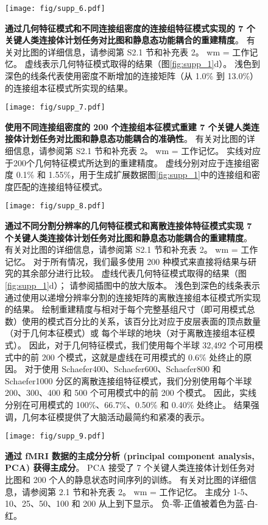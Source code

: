 \documentclass[lang=cn,a4paper,newtx]{elegantpaper}
\begin{document}
\begin{figure}[!htb] 
	\centering
	\texttt{[image: fig/supp\_6.pdf]}
	\caption{
		\textbf{通过几何特征模式和不同连接组密度的连接组特征模式实现的 7 个关键人类连接体计划任务对比图和静息态功能耦合的重建精度}。
		有关对比图的详细信息，请参阅第 S2.1 节和补充表 2。
		wm = 工作记忆。
		虚线表示几何特征模式取得的结果（图\ref{fig:supp_1}d）。
		浅色到深色的线条代表使用密度不断增加的连接矩阵（从 1.0\% 到 13.0\%）的连接组本征模式所实现的结果。
	} \label{fig:supp_6}
\end{figure}


\begin{figure}[!htb] 
	\centering
	\texttt{[image: fig/supp\_7.pdf]}
	\caption{
		\textbf{使用不同连接组密度的 200 个连接组本征模式重建 7 个关键人类连接体计划任务对比图和静息态功能耦合的准确性}。
		有关对比图的详细信息，请参阅第 S2.1 节和补充表 2。
		wm = 工作记忆。
		实线对应于200个几何特征模式所达到的重建精度。
		虚线分别对应于连接组密度 0.1\% 和 1.55\%，用于生成扩展数据图\ref{fig:supp_1}中的连接组和密度匹配的连接组特征模式。
	} \label{fig:supp_7}
\end{figure}


\begin{figure}[!htb] 
	\centering
	\texttt{[image: fig/supp\_8.pdf]}
	\caption{
	\textbf{通过不同分割分辨率的几何特征模式和离散连接体特征模式实现 7 个关键人类连接体计划任务对比图和静息态功能耦合的重建精度}。
	有关对比图的详细信息，请参阅第 S2.1 节和补充表 2。 wm = 工作记忆。
	对于所有情况，我们最多使用 200 种模式来直接将结果与研究的其余部分进行比较。
	虚线代表几何特征模式取得的结果（图\ref{fig:supp_1}d）；
	请参阅插图中的放大版本。
	浅色到深色的线条表示通过使用以递增分辨率分割的连接矩阵的离散连接组本征模式所实现的结果。
	绘制重建精度与相对于每个完整基组尺寸（即可用模式总数）使用的模式百分比的关系，该百分比对应于皮层表面的顶点数量（对于几何本征模式）或 每个半球的地块（对于离散连接组本征模式）。
	因此，对于几何特征模式，我们使用每个半球 32,492 个可用模式中的前 200 个模式，这就是虚线在可用模式的 0.6\% 处终止的原因。
	对于使用 Schaefer400、Schaefer600、Schaefer800 和 Schaefer1000 分区的离散连接组特征模式，我们分别使用每个半球 200、300、400 和 500 个可用模式中的前 200 个模式。
	因此，实线分别在可用模式的 100\%、66.7\%、0.50\% 和 0.40\% 处终止。
	结果强调，几何本征模提供了大脑活动最简约和紧凑的表示。
	} \label{fig:supp_8}
\end{figure}



\begin{figure}[!htb] 
	\centering
	\texttt{[image: fig/supp\_9.pdf]}
	\caption{
		\textbf{通过 fMRI 数据的主成分分析 (principal component analysis, PCA) 获得主成分}。
		PCA 接受了 7 个关键人类连接体计划任务对比图和 200 个人的静息状态时间序列的训练。
		有关对比图的详细信息，请参阅第 2.1 节和补充表 2。
		wm = 工作记忆。
		主成分 1-5、10、25、50、100 和 200 从上到下显示。
		负-零-正值被着色为蓝-白-红。
	} \label{fig:supp_9}
\end{figure}
\end{document}
